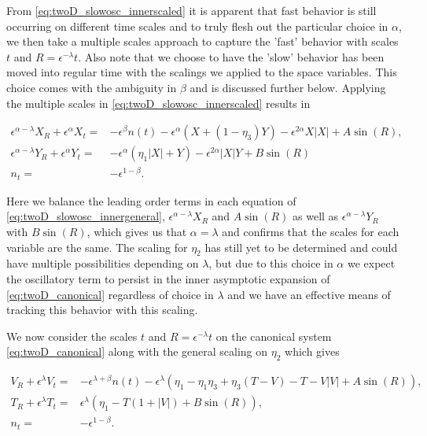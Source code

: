 From \eqref{eq:twoD_slowosc_innerscaled} it is apparent that fast behavior is still occurring on different time scales and to truly flesh out the particular choice in $\alpha$, we then take a multiple scales approach to capture the 'fast' behavior with scales $t$ and $R=\epsilon^{-\lambda}t$. Also note that we choose to have the 'slow' behavior has been moved into regular time with the scalings we applied to the space variables. This choice comes with the ambiguity in $\beta$ and is discussed further below. Applying the multiple scales in \eqref{eq:twoD_slowosc_innerscaled} results in

\begin{equation}\label{eq:twoD_slowosc_innergeneral}
\begin{aligned}
\epsilon^{\alpha-\lambda} X_R+\epsilon^{\alpha}X_t=& -\epsilon^{\beta}n(t)-\epsilon^{\alpha}(X+(1-\eta_3)Y)-\epsilon^{2\alpha}X|X|+A\sin(R),\\
\epsilon^{\alpha-\lambda}Y_R + \epsilon^{\alpha}Y_t =&- \epsilon^\alpha(\eta_1|X|+Y)-\epsilon^{2\alpha}|X|Y +B\sin(R)\\
n_t=&-\epsilon^{1-\beta}.
\end{aligned}
\end{equation}

Here we balance the leading order terms in each equation of \eqref{eq:twoD_slowosc_innergeneral}, $\epsilon^{\alpha-\lambda}X_R$ and $A\sin(R)$ as well as $\epsilon^{\alpha-\lambda}Y_R$ with $B\sin(R)$, which gives us that $\alpha=\lambda$ and confirms that the scales for each variable are the same. The scaling for $\eta_2$ has still yet to be determined and could have multiple possibilities depending on $\lambda$, but due to this choice in $\alpha$ we expect the oscillatory term to persist in the inner asymptotic expansion of \eqref{eq:twoD_canonical} regardless of choice in $\lambda$ and we have an effective means of tracking this behavior with this scaling.

We now consider the scales $t$ and $R=\epsilon^{-\lambda}t$ on the canonical system \eqref{eq:twoD_canonical} along with the general scaling on $\eta_2$ which gives

\begin{equation}\label{eq:twoD_slowosc_general_outermulti}
\begin{aligned}
V_R+\epsilon^{\lambda}V_t =& -\epsilon^{\lambda+\beta}n(t)-\epsilon^{\lambda}(\eta_1-\eta_1\eta_3+\eta_3(T-V)-T-V|V|+A\sin(R)),\\
T_R+\epsilon^{\lambda}T_t =& \epsilon^\lambda(\eta_1-T(1+|V|)+B\sin(R)),\\
n_t =&-\epsilon^{1-\beta}.
\end{aligned}
\end{equation}


